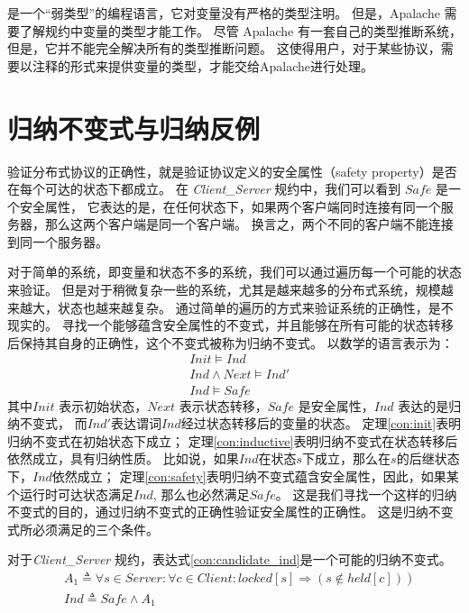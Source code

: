 \TLA 是一个“弱类型”的编程语言，它对变量没有严格的类型注明。
但是，Apalache 需要了解\TLA 规约中变量的类型才能工作。
尽管 Apalache 有一套自己的类型推断系统，但是，它并不能完全解决所有的类型推断问题。
这使得用户，对于某些协议，需要以注释的形式来提供变量的类型，才能交给Apalache进行处理。

\section{归纳不变式与归纳反例}
验证分布式协议的正确性，就是验证协议定义的安全属性（safety property）是否在每个可达的状态下都成立。
在 \textit{Client\_Server} 规约中，我们可以看到 $Safe$ 是一个安全属性，
它表达的是，在任何状态下，如果两个客户端同时连接有同一个服务器，那么这两个客户端是同一个客户端。
换言之，两个不同的客户端不能连接到同一个服务器。

对于简单的系统，即变量和状态不多的系统，我们可以通过遍历每一个可能的状态来验证。
但是对于稍微复杂一些的系统，尤其是越来越多的分布式系统，规模越来越大，状态也越来越复杂。
通过简单的遍历的方式来验证系统的正确性，是不现实的。
寻找一个能够蕴含安全属性的不变式，并且能够在所有可能的状态转移后保持其自身的正确性，这个不变式被称为归纳不变式。
以数学的语言表示为：
\begin{align}
    &Init \vDash Ind \label{con:init}\\
    &Ind \land Next \vDash Ind' \label{con:inductive}\\
    &Ind \vDash Safe \label{con:safety}
\end{align}
其中$Init$ 表示初始状态，$Next$ 表示状态转移，$Safe$ 是安全属性，$Ind$ 表达的是归纳不变式，
而$Ind'$表达谓词$Ind$经过状态转移后的变量的状态。
定理\ref{con:init}表明归纳不变式在初始状态下成立；
定理\ref{con:inductive}表明归纳不变式在状态转移后依然成立，具有归纳性质。
比如说，如果$Ind$在状态$s$下成立，那么在$s$的后继状态下，$Ind$依然成立；
定理\ref{con:safety}表明归纳不变式蕴含安全属性，因此，如果某个运行时可达状态满足$Ind$, 那么也必然满足$Safe$。
这是我们寻找一个这样的归纳不变式的目的，通过归纳不变式的正确性验证安全属性的正确性。
这是归纳不变式所必须满足的三个条件。

对于\textit{Client\_Server} 规约，表达式\ref{con:candidate_ind}是一个可能的归纳不变式。
\begin{align}
    &\left.A_{1} \triangleq \forall s \in  { Server }: \forall c \in  { Client }:  { locked }[s] \Rightarrow(s \notin { held }[c])\right) \\
    &{ Ind } \triangleq  { Safe } \wedge A_{1} \label{con:candidate_ind}
\end{align}

